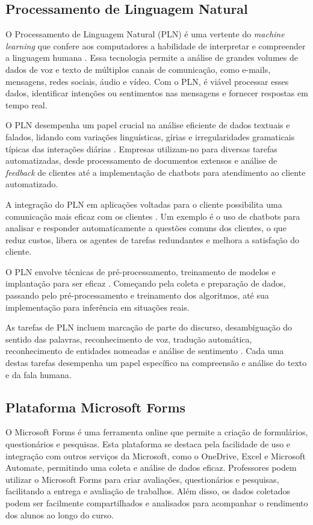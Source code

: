 \subsection{Processamento de Linguagem Natural}

O Processamento de Linguagem Natural (PLN) é uma vertente do \textit{machine learning} que confere aos computadores a habilidade de interpretar e compreender a linguagem humana \cite{amazonnlp2023}. Essa tecnologia permite a análise de grandes volumes de dados de voz e texto de múltiplos canais de comunicação, como e-mails, mensagens, redes sociais, áudio e vídeo. Com o PLN, é viável processar esses dados, identificar intenções ou sentimentos nas mensagens e fornecer respostas em tempo real.

O PLN desempenha um papel crucial na análise eficiente de dados textuais e falados, lidando com variações linguísticas, gírias e irregularidades gramaticais típicas das interações diárias \cite{amazonnlp2023}. Empresas utilizam-no para diversas tarefas automatizadas, desde processamento de documentos extensos e análise de \textit{feedback} de clientes até a implementação de chatbots para atendimento ao cliente automatizado.

A integração do PLN em aplicações voltadas para o cliente possibilita uma comunicação mais eficaz com os clientes \cite{amazonnlp2023}. Um exemplo é o uso de chatbots para analisar e responder automaticamente a questões comuns dos clientes, o que reduz custos, libera os agentes de tarefas redundantes e melhora a satisfação do cliente.

O PLN envolve técnicas de pré-processamento, treinamento de modelos e implantação para ser eficaz \cite{amazonnlp2023}. Começando pela coleta e preparação de dados, passando pelo pré-processamento e treinamento dos algoritmos, até sua implementação para inferência em situações reais.

As tarefas de PLN incluem marcação de parte do discurso, desambiguação do sentido das palavras, reconhecimento de voz, tradução automática, reconhecimento de entidades nomeadas e análise de sentimento \cite{amazonnlp2023}. Cada uma destas tarefas desempenha um papel específico na compreensão e análise do texto e da fala humana.

\subsection{Plataforma Microsoft Forms}

O Microsoft Forms é uma ferramenta online que permite a criação de formulários, questionários e pesquisas. Esta plataforma se destaca pela facilidade de uso e integração com outros serviços da Microsoft, como o OneDrive, Excel e Microsoft Automate, permitindo uma coleta e análise de dados eficaz. Professores podem utilizar o Microsoft Forms para criar avaliações, questionários e pesquisas, facilitando a entrega e avaliação de trabalhos. Além disso, os dados coletados podem ser facilmente compartilhados e analisados para acompanhar o rendimento dos alunos ao longo do curso.

